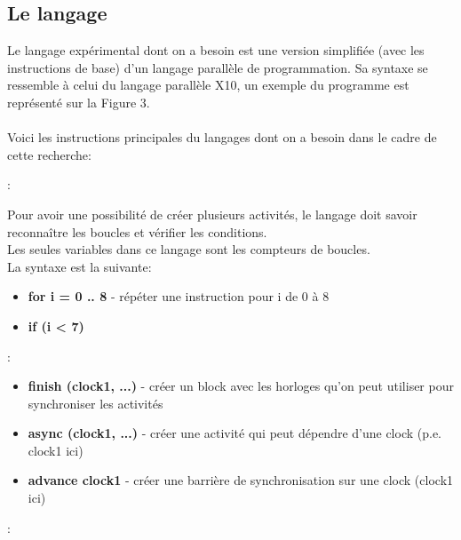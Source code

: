 \documentclass[12pt]{scrartcl}
\begin{document}
\subsection{Le langage}

Le langage expérimental dont on a besoin est une version simplifiée (avec les instructions de base)
  d'un langage parallèle de programmation. 
Sa syntaxe se ressemble à celui du langage parallèle X10, un exemple du programme est représenté sur la Figure 3. \\\\Voici les instructions principales du langages dont on a besoin dans le cadre de cette recherche: \\


 \begin{description}[itemsep=2em]
  \item[Boucles et Tests] :

  Pour avoir une possibilité de créer plusieurs activités, le langage doit savoir reconnaître les boucles et vérifier 
  les conditions. \\ Les seules variables dans ce langage sont les compteurs de boucles. \\La syntaxe est la suivante: 


  \begin{itemize} 
    \item \textbf{for i = 0 .. 8 {}} - répéter une instruction pour i de 0 à 8
    \item \textbf{if (i < 7) {}}
  \end{itemize} 


\item[Les instructions de programmation parallèle] :

\begin{itemize} 
  \item \textbf{finish (clock1, ...) {}} - créer un block avec les horloges qu'on peut utiliser pour synchroniser les activités
  \item \textbf{async (clock1, ...) {}} - créer une activité qui peut dépendre d'une clock (p.e. clock1 ici)
  \item \textbf{advance clock1} - créer une barrière de synchronisation sur une clock (clock1 ici)
\end{itemize} 
\newpage
\item[Les horloges] :
 


\end{description}
\end{document}
